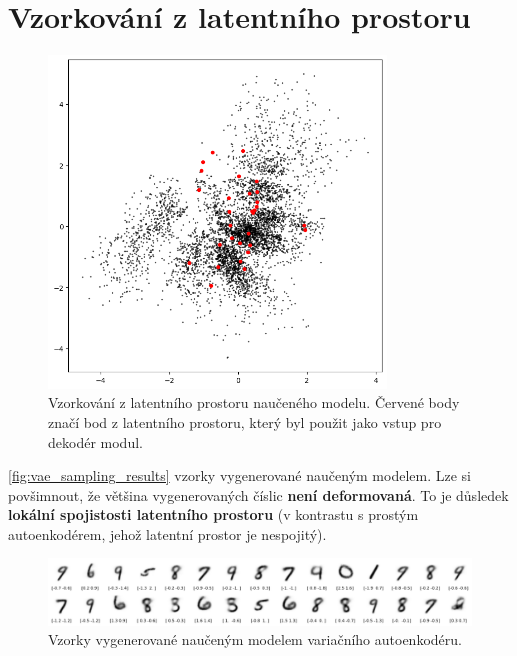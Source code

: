 \section{Vzorkování z latentního prostoru}

\begin{figure}[H]
    \centering
    \includegraphics[width=0.8\textwidth]{figures/vae_sampling_latent_space.png}
    \caption{Vzorkování z latentního prostoru naučeného modelu. Červené body značí bod z latentního prostoru, který byl použit jako vstup pro dekodér modul.}
\end{figure}

\autoref{fig:vae_sampling_results} vzorky vygenerované naučeným modelem. Lze si povšimnout, že většina vygenerovaných číslic \textbf{není deformovaná}.
To je důsledek \textbf{lokální spojistosti latentního prostoru} (v kontrastu s prostým autoenkodérem, jehož latentní prostor je nespojitý).

\begin{figure}[H]
    \centering
    \includegraphics[width=\textwidth]{figures/vae_model_sampling_latent_space_results.png}
    \caption{Vzorky vygenerované naučeným modelem variačního autoenkodéru.}
    \label{fig:vae_sampling_results}
\end{figure}